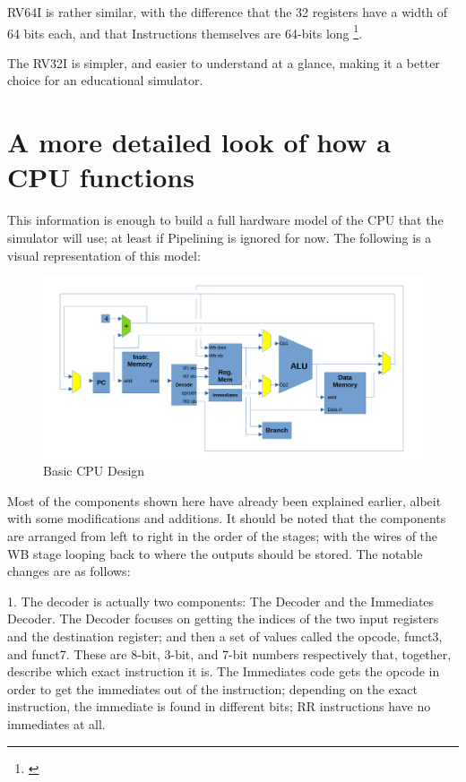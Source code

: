 \documentclass[12pt,twoside]{reedthesis}
\begin{document}
RV64I is rather similar, with the difference that the 32 registers have a width of 64 bits each, and that Instructions themselves are 64-bits long \footnote{\cite{waterman}}.

The RV32I is simpler, and easier to understand at a glance, making it a better choice for an educational simulator.

\section{A more detailed look of how a CPU functions}

This information is enough to build a full hardware model of the CPU that the simulator will use; at least if Pipelining is ignored for now. The following is a visual representation of this model:

\begin{figure}[h!]

	\centering
	\includegraphics[scale=0.6]{cpu_basic}
	\caption{Basic CPU Design}
	\label{cpu-basic}
\end{figure}

Most of the components shown here have already been explained earlier, albeit with some modifications and additions. It should be noted that the components are arranged from left to right in the order of the stages; with the wires of the WB stage looping back to where the outputs should be stored. The notable changes are as follows:

1. The decoder is actually two components: The Decoder and the Immediates Decoder. The Decoder focuses on getting the indices of the two input registers and the destination register; and then a set of values called the opcode, funct3, and funct7. These are 8-bit, 3-bit, and 7-bit numbers respectively that, together, describe which exact instruction it is. The Immediates code gets the opcode in order to get the immediates out of the instruction; depending on the exact instruction, the immediate is found in different bits; RR instructions have no immediates at all.
\end{document}
